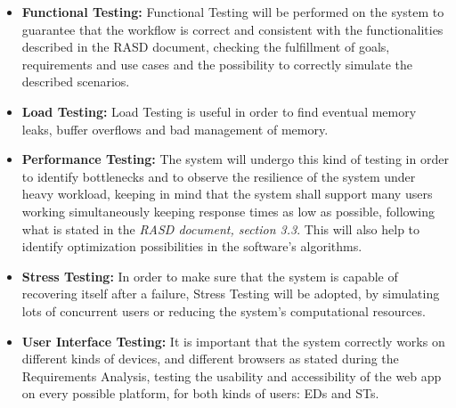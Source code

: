 \begin{itemize}
    \item \textbf{Functional Testing: }Functional Testing will be performed on the system to guarantee that the workflow is correct and consistent with the functionalities described in the RASD document, checking the fulfillment of goals, requirements and use cases and the possibility to correctly simulate the described scenarios. 
    \item \textbf{Load Testing:} Load Testing is useful in order to find eventual memory leaks, buffer overflows and bad management of memory.
    \item \textbf{Performance Testing:} The system will undergo this kind of testing in order to identify bottlenecks and to observe the resilience of the system under heavy workload, keeping in mind that the system shall support many users working simultaneously keeping response times as low as possible, following what is stated in the \textit{RASD document, section 3.3}. This will also help to identify optimization possibilities in the software’s algorithms.
    \item \textbf{Stress Testing:} In order to make sure that the system is capable of recovering itself after a failure, Stress Testing will be adopted, by simulating lots of concurrent users or reducing the system’s computational resources.
    \item \textbf{User Interface Testing:} It is important that the system correctly works on different kinds of devices, and different browsers as stated during the Requirements Analysis, testing the usability and accessibility of the web app on every possible platform, for both kinds of users: EDs and STs. 
\end{itemize}